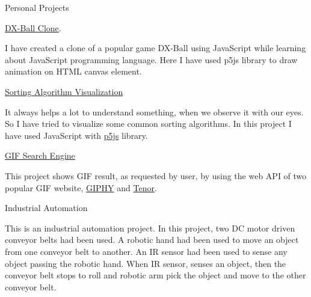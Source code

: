\documentclass{article}
\newlength{\tabin}
\newlength{\secsep}
\newcommand{\lineunder}{\vspace*{-8pt} \\ \hspace*{-6pt} \hrulefill \\ \vspace*{-15pt}}
\newenvironment{tabbedsection}[1]{
  \begin{list}{}{
      \setlength{\itemsep}{0pt}
      \setlength{\labelsep}{0pt}
      \setlength{\labelwidth}{0pt}
      \setlength{\leftmargin}{\tabin}
      \setlength{\rightmargin}{\tabin}
      \setlength{\listparindent}{0pt}
      \setlength{\parsep}{0pt}
      \setlength{\parskip}{0pt}
      \setlength{\partopsep}{0pt}
      \setlength{\topsep}{#1}
    }
  \item[]
}{\end{list}}
\newenvironment{resume_section}[1]{
  \filbreak
  \vspace{2\secsep}
  \textsc{\large#1}
  \lineunder
  \begin{tabbedsection}{\secsep}
}{\end{tabbedsection}}
\newenvironment{resume_subsection}[2][]{
  \textbf{#2} \hfill {\footnotesize #1} \hspace{2em}
  \begin{tabbedsection}{0.5\secsep}
}{\end{tabbedsection}}
\newenvironment{subitems}{
  \renewcommand{\labelitemi}{-}
  \begin{itemize}
      \setlength{\labelsep}{1em}
}{\end{itemize}}
\begin{document}
\begin{resume_section}{Personal Projects}
  \begin{resume_subsection}[(August 2020)]{\href{https://ehsanulkarim.me/dx_ball_clone}{DX-Ball Clone}.}
    \begin{subitems}
       I have created a clone of a popular game DX-Ball using JavaScript while learning about JavaScript programming language. Here I have used p5js library to draw animation on HTML canvas element.
    \end{subitems}
  \end{resume_subsection}


  \begin{resume_subsection}[(September 2020)]{\href{https://ehsanulkarim.me/sorting_algo_visualization}{Sorting Algorithm Visualization}}
    \begin{subitems}
      It always helps a lot to understand something, when we observe it with our eyes. So I have tried to visualize some common sorting algorithms. In this project I have used JavaScript with \href{https://p5js.org/}{p5js} library.
     \end{subitems}
  \end{resume_subsection}
  
  \begin{resume_subsection}[(January 2021)]{\href{https://ehsanulkarim.me/gif_search_engine/}{GIF Search Engine}}
    \begin{subitems}
      This project shows GIF result, as requested by user, by using the web API of two popular GIF website, \href{https://giphy.com/}{GIPHY} and \href{https://tenor.com/}{Tenor}.
    \end{subitems}
  \end{resume_subsection}

  \begin{resume_subsection}[(May 2017)]{Industrial Automation}
    \begin{subitems}
      This is an industrial automation project. In this project, two DC motor driven conveyor belts had been used. A robotic hand had been used to move an object from one conveyor belt to another. An IR sensor had been used to sense any object passing the robotic hand. When IR sensor, senses an object, then the conveyor belt stops to roll and robotic arm pick the object and move to the other conveyor belt.
    \end{subitems}
  \end{resume_subsection}
\end{resume_section}%
\end{document}
